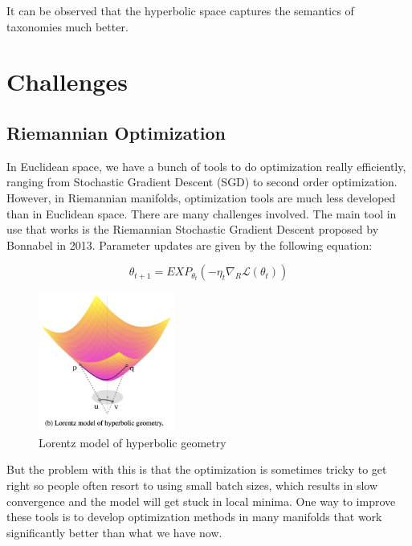 It can be observed that the hyperbolic space captures the semantics of taxonomies much better.


\section{Challenges}

\subsection{Riemannian Optimization}

In Euclidean space, we have a bunch of tools to do optimization really efficiently, ranging from Stochastic Gradient Descent (SGD) to second order optimization. However, in Riemannian manifolds, optimization tools are much less developed than in Euclidean space. There are many challenges involved. The main tool in use that works is the Riemannian Stochastic Gradient Descent proposed by Bonnabel in 2013. Parameter updates are given by the following equation:

\begin{equation} \label{eq:RSGD}
    \theta_{t+1} = EXP_{\theta_t} (−\eta_t \nabla_R \mathcal{L}(\theta_t))
\end{equation}

\begin{figure}[htb]
  \centering
    \includegraphics[width=0.4\textwidth]{lectures/11-b/Images/1-Lorentz.png}
    \caption{Lorentz model of hyperbolic geometry}
    \label{fig:1-Lorentz}
\end{figure}

But the problem with this is that the optimization is sometimes tricky to get right so people often resort to using small batch sizes, which results in slow convergence and the model will get stuck in local minima. One way to improve these tools is to develop optimization methods in many manifolds that work significantly better than what we have now.

